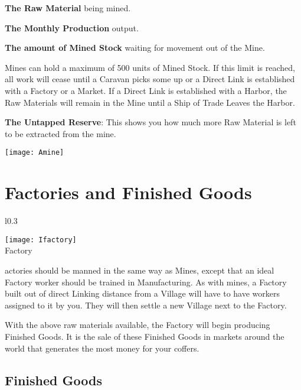 \textbf{The Raw Material} being mined.

\textbf{The Monthly Production} output.

\textbf{The amount of Mined Stock} waiting for movement out of the Mine.

Mines can hold a maximum of 500 units of Mined Stock. If this limit is reached, all work will cease until a Caravan picks some up or a Direct Link is established with a Factory or a Market. If a Direct Link is established with a Harbor, the Raw Materials will remain in the Mine until a Ship of Trade Leaves the Harbor.

\textbf{The Untapped Reserve}: This shows you how much more Raw Material is left to be extracted from the mine.

\begin{center}
    \texttt{[image: Amine]} %
\end{center}

\section{\textsf{Factories and Finished Goods}}

\begin{wrapfigure}{l}{0.3\textwidth}
    \vspace{-20pt}
    \begin{center}
        \texttt{[image: Ifactory]}
        \\ Factory
    \end{center}
    \vspace{-20pt}
\end{wrapfigure}

actories should be manned in the same way as Mines, except that an ideal Factory worker should be trained in Manufacturing. As with mines, a Factory built out of direct Linking distance from a Village will have to have workers assigned to it by you. They will then settle a new Village next to the Factory.

With the above raw materials available, the Factory will begin producing Finished Goods. It is the sale of these Finished Goods in markets around the world that generates the most money for your coffers.

\subsection{\textsf{Finished Goods}}

